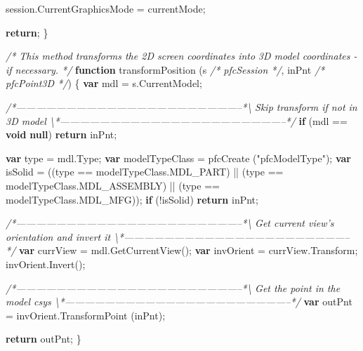\documentclass[]{article}
\newenvironment{Shaded}{}{}
\newcommand{\KeywordTok}[1]{\textcolor[rgb]{0.00,0.44,0.13}{\textbf{{#1}}}}
\newcommand{\StringTok}[1]{\textcolor[rgb]{0.25,0.44,0.63}{{#1}}}
\newcommand{\CommentTok}[1]{\textcolor[rgb]{0.38,0.63,0.69}{\textit{{#1}}}}
\newcommand{\OtherTok}[1]{\textcolor[rgb]{0.00,0.44,0.13}{{#1}}}
\newcommand{\FunctionTok}[1]{\textcolor[rgb]{0.02,0.16,0.49}{{#1}}}
\newcommand{\NormalTok}[1]{{#1}}
\begin{document}
\begin{Shaded}
\begin{Highlighting}[]
  \OtherTok{session}\NormalTok{.}\FunctionTok{CurrentGraphicsMode} \NormalTok{=  currentMode;}
  
  \KeywordTok{return}\NormalTok{;}
\NormalTok{\}}


\CommentTok{/* This method transforms the 2D screen coordinates into }
\CommentTok{   3D model coordinates - if necessary. */}
\KeywordTok{function} \FunctionTok{transformPosition} \NormalTok{(s }\CommentTok{/* pfcSession */}\NormalTok{, inPnt }\CommentTok{/* pfcPoint3D */}\NormalTok{)}
\NormalTok{\{}
  \KeywordTok{var} \NormalTok{mdl = }\OtherTok{s}\NormalTok{.}\FunctionTok{CurrentModel}\NormalTok{;}
  
\CommentTok{/*--------------------------------------------------------------------*\textbackslash{} }
\CommentTok{  Skip transform if not in 3D model }
\CommentTok{\textbackslash{}*--------------------------------------------------------------------*/} 
  \KeywordTok{if} \NormalTok{(mdl == }\KeywordTok{void} \KeywordTok{null}\NormalTok{)}
    \KeywordTok{return} \NormalTok{inPnt;}
  
  \KeywordTok{var} \NormalTok{type = }\OtherTok{mdl}\NormalTok{.}\FunctionTok{Type}\NormalTok{;}
  \KeywordTok{var} \NormalTok{modelTypeClass =  }\FunctionTok{pfcCreate} \NormalTok{(}\StringTok{"pfcModelType"}\NormalTok{);}
  \KeywordTok{var} \NormalTok{isSolid = ((type == }\OtherTok{modelTypeClass}\NormalTok{.}\FunctionTok{MDL_PART}\NormalTok{) || }
         \NormalTok{(type == }\OtherTok{modelTypeClass}\NormalTok{.}\FunctionTok{MDL_ASSEMBLY}\NormalTok{) || }
         \NormalTok{(type == }\OtherTok{modelTypeClass}\NormalTok{.}\FunctionTok{MDL_MFG}\NormalTok{));}
  \KeywordTok{if} \NormalTok{(!isSolid)}
    \KeywordTok{return} \NormalTok{inPnt;}
  
\CommentTok{/*--------------------------------------------------------------------*\textbackslash{} }
\CommentTok{  Get current view's orientation and invert it}
\CommentTok{\textbackslash{}*--------------------------------------------------------------------*/} 
  \KeywordTok{var} \NormalTok{currView = }\OtherTok{mdl}\NormalTok{.}\FunctionTok{GetCurrentView}\NormalTok{();}
  \KeywordTok{var} \NormalTok{invOrient = }\OtherTok{currView}\NormalTok{.}\FunctionTok{Transform}\NormalTok{;}
  \OtherTok{invOrient}\NormalTok{.}\FunctionTok{Invert}\NormalTok{();}
  
\CommentTok{/*--------------------------------------------------------------------*\textbackslash{} }
\CommentTok{  Get the point in the model csys}
\CommentTok{\textbackslash{}*--------------------------------------------------------------------*/} 
  \KeywordTok{var} \NormalTok{outPnt = }\OtherTok{invOrient}\NormalTok{.}\FunctionTok{TransformPoint} \NormalTok{(inPnt);}
  
  \KeywordTok{return} \NormalTok{outPnt;}
\NormalTok{\}}
\end{Highlighting}
\end{Shaded}
\end{document}
